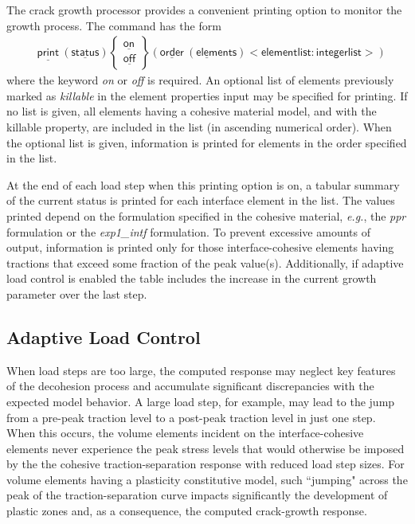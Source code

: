 \documentclass[11pt]{report}
\numberwithin{equation}{section}
\newcommand{\ul} {\underline}
\newcommand{\hv} {\mathsf}   %
\newcommand{\ti}{\emph}
\newcommand{\eg}{\ti{e.g.},\xspace}
\begin{document}
The crack growth processor provides a convenient printing option to monitor the
growth process. The command has the form
\begin{align*}
&\hv{\ul{print}\ (\ul{status})} 
\begin{Bmatrix}
\hv{\ul{on}} \\ \hv{\ul{off}}\end{Bmatrix}\hv{(\ul{order}
\ (\ul{elem}ents) <element list: integerlist>)}
\end{align*}
where the keyword \ti{on} or \ti{off} is required. An optional list 
of elements previously
marked as \ti{killable} in the element properties input
may be specified for printing. If no list is given, all
elements having a cohesive material model, and with the killable property, are
included in the list (in ascending numerical order). When the optional list is
given, information is printed for elements in the order specified in the list.

At the end of each load step when this printing option is on, a tabular
summary of the current status is printed for each interface element in the list. 
The values printed depend on the formulation specified in the
cohesive material, \eg the \ti{ppr} formulation or the \ti{exp1\_intf}
formulation. To prevent excessive amounts of output, information 
is printed only for those interface-cohesive elements having tractions 
that exceed some fraction
of the peak value(s). Additionally, if adaptive load control 
is enabled the table includes the increase in the current growth 
parameter over the last step.
%
%

\subsection{Adaptive Load Control}
When load steps are too large, the computed response may neglect key features of
the decohesion process and accumulate significant discrepancies with the
expected model behavior. A large load step, for example, may lead to the jump from
a pre-peak traction level to a post-peak traction
level in just one step. When this occurs, the volume elements
incident on the interface-cohesive elements never experience
the peak stress levels that would otherwise be imposed by the
the cohesive traction-separation response with reduced load step
sizes. For volume elements having a plasticity constitutive model, such ``jumping" across
the peak of the traction-separation curve impacts significantly the development of
plastic zones and, as a consequence, the computed crack-growth response.
\end{document}
